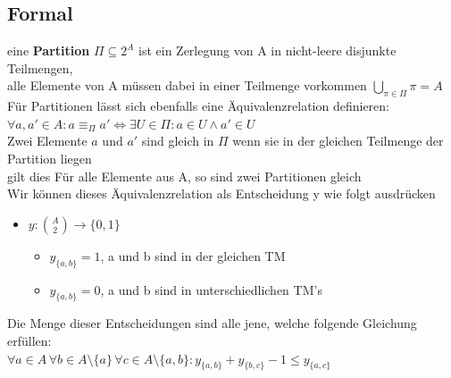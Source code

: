 \documentclass[12pt,a4paper]{article}
\newcommand{\nl}{\\[0.1cm]}
\begin{document}
\subsection{Formal}
eine \textbf{Partition} $\Pi \subseteq 2^A$ ist ein Zerlegung von A in nicht-leere disjunkte Teilmengen,\\
alle Elemente von A müssen dabei in einer Teilmenge vorkommen $\displaystyle \bigcup_{\pi\in\Pi} \pi = A$\nl
Für Partitionen lässt sich ebenfalls eine Äquivalenzrelation definieren:\nl
$\forall a, a' \in A: a \equiv_{\Pi} a' \Leftrightarrow \exists U \in \Pi : a \in U \land a' \in U$\nl
Zwei Elemente $a$ und $a'$ sind gleich in $\Pi$ wenn sie in der gleichen Teilmenge der Partition liegen\\
gilt dies Für alle Elemente aus A, so sind zwei Partitionen gleich\\
Wir können dieses Äquivalenzrelation als Entscheidung y wie folgt ausdrücken
\begin{itemize}
\item $y : \binom{A}{2} \rightarrow \{0,1\}$
\begin{itemize}
\item $y_{\{a,b\}} = 1$, a und b sind in der gleichen TM
\item $y_{\{a,b\}} = 0$, a und b sind in unterschiedlichen TM's
\end{itemize}
\end{itemize}
Die Menge dieser Entscheidungen sind alle jene, welche folgende Gleichung erfüllen:\nl
$\forall a\in A \, \forall b \in A \setminus \{a\} \, \forall c \in A \setminus \{a,b\}: y_{\{a,b\}} + y_{\{b,c\}} -1 \leq y_{\{a,c\}}$\nl
\end{document}
